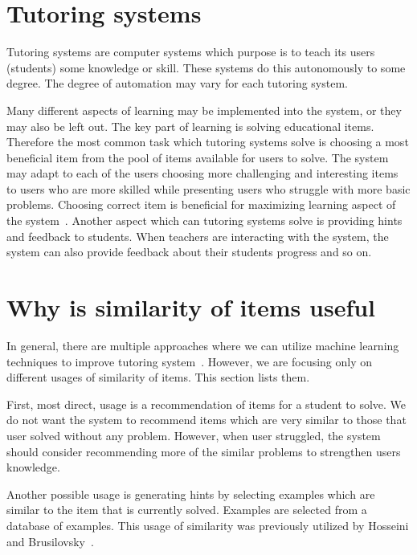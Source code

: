 \documentclass[
  print, %
  table,   %
  nolof,     %
  nolot,     %
  nocover,
  color,
  final,
]{fithesis3}
\begin{document}

\section{Tutoring systems}\label{tutoring-systems}

Tutoring systems are computer systems which purpose is to teach its users (students) some knowledge or skill. These systems do this autonomously to some degree. The degree of automation may vary for each tutoring system.


Many different aspects of learning may be implemented into the system, or they may also be left out. The key part of learning is solving educational items. Therefore the most common task which tutoring systems solve is choosing a most beneficial item from the pool of items available for users to solve. The system may adapt to each of the users choosing more challenging and interesting items to users who are more skilled while presenting users who struggle with more basic problems. Choosing correct item is beneficial for maximizing learning aspect of the system~\cite{papouvsek2015impact}. Another aspect which can tutoring systems solve is providing hints and feedback to students. When teachers are interacting with the system, the system can also provide feedback about their students progress and so on.


\section{Why is similarity of items useful}\label{why-is-similarity-of-items-useful}


In general, there are multiple approaches where we can utilize machine learning techniques to improve tutoring system~\cite{baker2010data}. However, we are focusing only on different usages of similarity of items. This section lists them.

First, most direct, usage is a recommendation of items for a student to solve. We do not want the system to recommend items which are very similar to those that user solved without any problem. However, when user struggled, the system should consider recommending more of the similar problems to strengthen users knowledge.

Another possible usage is generating hints by selecting examples which are similar to the item that is currently solved. Examples are selected from a database of examples. This usage of similarity was previously utilized by Hosseini and Brusilovsky~\cite{hosseini2017study}.
\end{document}
